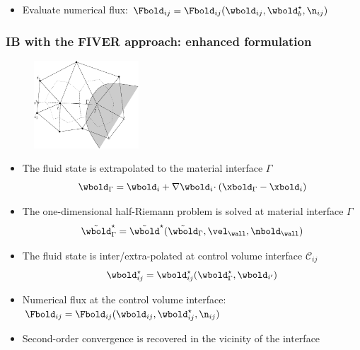 \begin{frame}
\begin{itemize}
\begin{columns}
\begin{column}{0.43\textwidth}
\begin{figure}[b!]
        \end{figure}
      \end{column}
    \end{columns}
    \item Evaluate numerical flux: $\Fbold_{ij} = \Fbold_{ij}(\wbold_{ij}, \wbold^\star_{b}, \n_{ij})$
  \end{itemize}
\end{frame}


\begin{frame}
  \frametitle{IB with the FIVER approach: enhanced formulation}
  \begin{figure}[h!]
    \centering
    \includegraphics[width=0.35\textwidth]{Fig/fiver2}
  \end{figure}
  \vspace{-5mm}
  \begin{itemize}
  \item The fluid state is extrapolated to the material interface $\Gamma$ \\[-4mm]
    \begin{equation*}
      \wbold_\Gamma = \wbold_i + \nabla \wbold_i \boldsymbol\!\cdot (\xbold_\Gamma - \xbold_i)
    \end{equation*} 
  \item The one-dimensional half-Riemann problem is solved at material interface $\Gamma$\\[-4mm]
    \begin{equation*}
      \tilde\wbold^\star_\Gamma =\tilde\wbold^\star(\tilde\wbold_\Gamma, \vel_\wall, \nbold_\wall)
    \end{equation*} 
  \item The fluid state is inter/extra-polated at control volume interface $\mathcal{C}_{ij}$\\[-4mm]
    \begin{equation*}
      \wbold^\star_{ij} = \wbold^\star_{ij}(\wbold^\star_\Gamma, \wbold_{i'})
    \end{equation*}
  \item Numerical flux at the control volume interface: $\Fbold_{ij} = \Fbold_{ij}(\wbold_{ij}, \wbold^\star_{ij}, \n_{ij})$
  \item  Second-order convergence is recovered in the vicinity of the interface
  \end{itemize}
\end{frame}




